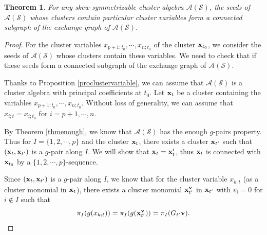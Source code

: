 \documentclass[14pt]{amsart}
\newtheorem{Theorem}{Theorem}[section]
\begin{document}
\begin{Theorem}\label{corconnected}
For any skew-symmetrizable cluster algebra $\mathcal A(\mathcal S)$,  the seeds of $\mathcal A(\mathcal S)$ whose clusters contain particular cluster variables form a connected subgraph of the exchange graph of $\mathcal A(\mathcal S)$.
\end{Theorem}
\begin{proof}
For the cluster variables $x_{p+1;t_0},\cdots,x_{n;t_0}$ of the cluster ${\bf x}_{t_0}$, we consider the seeds of $\mathcal A(\mathcal S)$ whose clusters contain these variables. We need to check that if these seeds form a connected subgraph of the exchange graph of $\mathcal A(\mathcal S)$.

Thanks to Proposition \ref{proclustervariable}, we can assume that $\mathcal A(\mathcal S)$ is a cluster algebra with principal coefficients at $t_0$. Let ${\bf x}_t$ be a cluster containing the variables  $x_{p+1;t_0},\cdots,x_{n;t_0}$.
 Without  loss of generality, we can assume that $x_{i;t}=x_{i;t_0}$ for $i=p+1,\cdots,n$.

  By Theorem \ref{thmenough}, we know that $\mathcal A(\mathcal S)$ has  the enough $g$-pairs property. Thus for $I=\{1,2,\cdots, p\}$ and the cluster ${\bf x}_t$, there exists a cluster ${\bf x}_{t^\prime}$ such that $({\bf x}_t,{\bf x}_{t^\prime})$ is a $g$-pair along $I$. We will show that ${\bf x}_t={\bf x}_t^\prime$, thus ${\bf x}_t$ is connected with ${\bf x}_{t_0}$ by a $\{1,2,\cdots,p\}$-sequence.


 Since $({\bf x}_t,{\bf x}_{t^\prime})$ is a $g$-pair along $I$, we know that for the cluster variable $x_{k;t}$ (as a cluster monomial in ${\bf x}_t$), there exists a cluster monomial ${\bf x}_{t^{\prime}}^{{\bf v}}$ in ${\bf x}_{t^{\prime}}$ with $v_i=0$  for $i\notin I$ such that
$$\pi_I(g(x_{k;t}))=\pi_I(g({\bf x}_{t^{\prime}}^{{\bf v}}))=\pi_I(G_{t^{\prime}}{\bf v}).$$



\end{proof}
\end{document}
